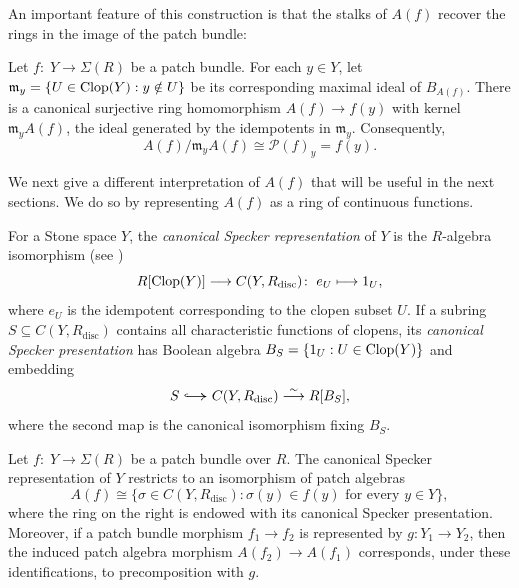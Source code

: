 \documentclass[11pt]{amsart}
\begin{document}
An important feature of this construction is that the stalks of $A(f)$ recover the rings in the image of the patch bundle:


 \begin{proposition}
\label{prop: stalks as factor rings}
Let $f\colon\; Y\to\Sigma(R)$ be a patch bundle. For each $y\in Y$, let $\mathfrak m_y=\{U\in\mbox{\rm Clop}(Y):y\notin U\}$ be its corresponding maximal ideal of $B_{A(f)}$.
There is a canonical surjective ring homomorphism
$A(f)\to f(y)$ with kernel $\mathfrak m_yA(f)$, the ideal
generated by the idempotents in $\mathfrak m_y$.
Consequently,
\[
A(f)/\mathfrak m_yA(f)\cong\mathcal P(f)_y=f(y).
\]
\end{proposition}

We next give a different interpretation of $A(f)$ that will be useful in the next sections. We do so by representing $A(f)$ as a ring of
continuous functions.

\medskip

For a Stone space $Y$, the {\it canonical Specker representation} of $Y$ is the $R$-algebra isomorphism  (see \cite[proof of Theorem~2.7]{BMMO})
$$
R[\mbox{\rm Clop}(Y)]\longrightarrow C(Y,R_{\mathrm{disc}})\colon\; e_U\longmapsto 1_U,
$$
where $e_U$ is the idempotent corresponding to the clopen subset $U$. If a subring $S\subseteq C(Y,R_{\mathrm{disc}})$
contains all characteristic functions of clopens, its {\it canonical Specker presentation} has Boolean algebra
$B_S=\{1_U:U\in\mbox{\rm Clop}(Y)\}$ and embedding
$$
S\mathrel{\scalebox{1.6}[1]{$\hookrightarrow$}} C(Y,R_{\mathrm{disc}})
\overset{\sim}{\longrightarrow}R[B_S],
$$
where the second map is the canonical isomorphism fixing $B_S$.

\begin{theorem}\label{C rep}
Let $f\colon\; Y\to\Sigma(R)$ be a patch bundle over $R$. The canonical
Specker representation of $Y$ restricts to an isomorphism of patch algebras
$$
A(f)\cong
\{\sigma\in C(Y,R_{\mathrm{disc}}):
  \sigma(y)\in f(y)\text{ for every }y\in Y\},
$$
where the ring on the right is endowed with its canonical Specker presentation. Moreover, if a patch bundle morphism
$f_1\to f_2$ is represented by $g\colon Y_1\to Y_2$, then the induced patch algebra morphism $A(f_2)\to A(f_1)$ corresponds, under these identifications,
to precomposition with $g$.
\end{theorem}
\end{document}
